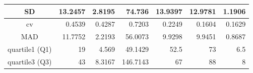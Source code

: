 \begin{table}[H]
\begin{adjustbox}{width = \textwidth, center}
\begin{tabular}{|c|rrrrrr|}
            \cellcolor[HTML]{CFE2F3}SD                                                   & \multicolumn{1}{r|}{13.2457}                                    & \multicolumn{1}{r|}{2.8195}                                                  & \multicolumn{1}{r|}{74.736}                                                      & \multicolumn{1}{r|}{13.9397}                             & \multicolumn{1}{r|}{12.9781}                            & 1.1906                                                           \\ \hline
            \cellcolor[HTML]{CFE2F3}cv                                                   & \multicolumn{1}{r|}{0.4539}                                     & \multicolumn{1}{r|}{0.4287}                                                  & \multicolumn{1}{r|}{0.7203}                                                      & \multicolumn{1}{r|}{0.2249}                              & \multicolumn{1}{r|}{0.1604}                             & 0.1629                                                           \\ \hline
            \cellcolor[HTML]{CFE2F3}MAD                                                  & \multicolumn{1}{r|}{11.7752}                                    & \multicolumn{1}{r|}{2.2193}                                                  & \multicolumn{1}{r|}{56.0073}                                                     & \multicolumn{1}{r|}{9.9298}                              & \multicolumn{1}{r|}{9.9451}                             & 0.8687                                                           \\ \hline
            quartile1 (Q1)                                                               & \multicolumn{1}{r|}{19}                                         & \multicolumn{1}{r|}{4.569}                                                   & \multicolumn{1}{r|}{49.1429}                                                     & \multicolumn{1}{r|}{52.5}                                & \multicolumn{1}{r|}{73}                                 & 6.5                                                              \\ \hline
            quartile3 (Q3)                                                               & \multicolumn{1}{r|}{43}                                         & \multicolumn{1}{r|}{8.3167}                                                  & \multicolumn{1}{r|}{146.7143}                                                    & \multicolumn{1}{r|}{67}                                  & \multicolumn{1}{r|}{88}                                 & 8                                                                \\ \hline

\end{tabular}
\end{adjustbox}
\end{table}
